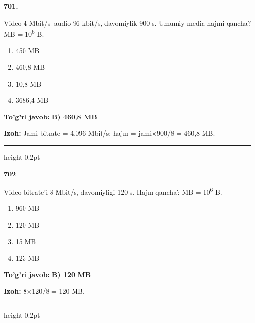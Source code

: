 \documentclass[10pt,a4paper,oneside]{article}
\begin{document}
\noindent\textbf{\color{ink}701.}
\par
Video 4 Mbit/s, audio 96 kbit/s, davomiylik 900 s. Umumiy media hajmi qancha? MB = 10\textsuperscript{6} B.
\begin{enumerate}[label=\Alph*),leftmargin=9mm]
\item 450 MB
\item 460,8 MB
\item 10,8 MB
\item 3686,4 MB
\end{enumerate}
\begin{tcolorbox}[enhanced,breakable,colback=teal!4,colframe=teal!50!black,boxrule=0.5pt,arc=1.1mm,left=3mm,right=3mm,top=1.7mm,bottom=1.7mm,before skip=2mm,after skip=2mm]
\textbf{\color{teal}To'g'ri javob:} \textbf{B) 460,8 MB}
\par\smallskip
\textbf{Izoh:} Jami bitrate = 4.096 Mbit/s; hajm = jami\ensuremath{\times}900/8 = 460,8 MB.
\end{tcolorbox}
\vspace{2mm}\hrule height 0.2pt \vspace{3mm}

\noindent\textbf{\color{ink}702.}
\par
Video bitrate'i 8 Mbit/s, davomiyligi 120 s. Hajm qancha? MB = 10\textsuperscript{6} B.
\begin{enumerate}[label=\Alph*),leftmargin=9mm]
\item 960 MB
\item 120 MB
\item 15 MB
\item 123 MB
\end{enumerate}
\begin{tcolorbox}[enhanced,breakable,colback=teal!4,colframe=teal!50!black,boxrule=0.5pt,arc=1.1mm,left=3mm,right=3mm,top=1.7mm,bottom=1.7mm,before skip=2mm,after skip=2mm]
\textbf{\color{teal}To'g'ri javob:} \textbf{B) 120 MB}
\par\smallskip
\textbf{Izoh:} 8\ensuremath{\times}120/8 = 120 MB.
\end{tcolorbox}
\vspace{2mm}\hrule height 0.2pt \vspace{3mm}
\end{document}
